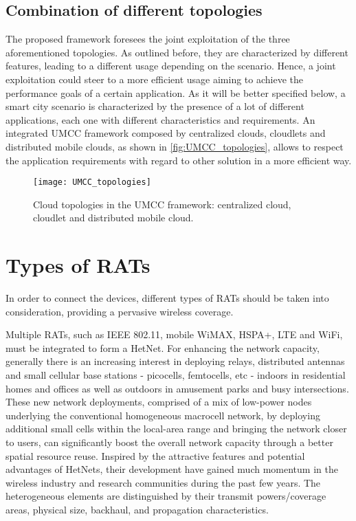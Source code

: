 \documentclass[twoside,openright]{report}
\begin{document}
 \subsection*{Combination of different topologies}
The proposed framework foresees the joint exploitation of the three aforementioned topologies. 
As outlined before, they are characterized by different features, leading to a different usage depending on the scenario. 
Hence, a joint exploitation could steer to a more efficient usage aiming to achieve the performance goals of a certain application.
As it will be better specified below, a smart city scenario is characterized by the presence of a lot of different applications, each one with different characteristics and requirements.
An integrated \gls{UMCC} framework composed by centralized clouds, cloudlets and distributed mobile clouds, as shown in \autoref{fig:UMCC_topologies}, allows to respect the application requirements with regard to other solution in a more efficient way.


\begin{figure}[tbp]
\centering
\texttt{[image: UMCC\_topologies]}
\caption{Cloud topologies in the UMCC framework: centralized cloud, cloudlet and distributed mobile cloud.}
\label{fig:UMCC_topologies}
\end{figure} 





\section{Types of RATs}
\label{sec:TypesRATs}

In order to connect the devices, different types of \glspl{RAT} should be taken into consideration, providing a pervasive wireless coverage.

Multiple \glspl{RAT}, such as \gls{IEEE 802.11}, mobile \gls{WiMAX}, 
\gls{HSPA+}, \gls{LTE} and \gls{WiFi}, must be integrated to form a \gls{HetNet}. For enhancing the network capacity, generally there is an increasing interest in deploying relays, distributed antennas and small cellular base stations - \glspl{picocell}, \glspl{femtocell}, etc - indoors in residential homes and offices as well as outdoors in amusement parks and busy intersections. 
These new network deployments, comprised of a mix of low-power nodes underlying the conventional homogeneous macrocell network, by deploying additional small cells within the local-area range and bringing the network closer to users, can significantly boost the overall network capacity through a better spatial resource reuse. Inspired by the attractive features and potential advantages of \glspl{HetNet}, their development have gained much momentum in the wireless industry and research communities during the past few years. 
The heterogeneous elements are distinguished by their transmit powers/coverage areas, physical size, backhaul, and propagation characteristics. 
\end{document}

